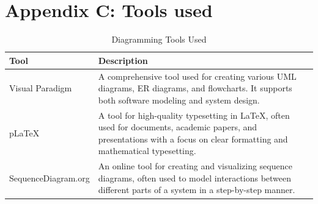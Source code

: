 \documentclass{scrreprt}
\begin{document}
\section{Appendix C: Tools used}
\begin{table}[H]
	\centering
	\begin{tabular}{|p{5cm}|p{5cm}|}
		\hline
		\textbf{Tool} & \textbf{Description} \\ \hline
		Visual Paradigm & A comprehensive tool used for creating various UML diagrams, ER diagrams, and flowcharts. It supports both software modeling and system design. \\ \hline
		pLaTeX & A tool for high-quality typesetting in LaTeX, often used for documents, academic papers, and presentations with a focus on clear formatting and mathematical typesetting. \\ \hline
		SequenceDiagram.org & An online tool for creating and visualizing sequence diagrams, often used to model interactions between different parts of a system in a step-by-step manner. \\ \hline
	\end{tabular}
	\caption{Diagramming Tools Used}
	\label{table:DiagrammingTools}
\end{table}
\end{document}

